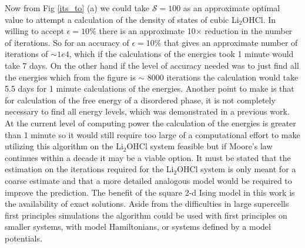 \documentclass[aps,prl,reprint,superscriptaddress,showkeys]{revtex4-1}
\begin{document}
 Now from Fig \ref{its_to} (a) we could take $\mathcal{S}=100$  as an approximate optimal value to attempt a calculation of the density of states of cubic Li$_2$OHCl. In willing to accept $\epsilon=10\%$ there is an approximate 10$\times$ reduction in the number of iterations. So for an accuracy of $\epsilon=10\%$ that gives an approximate number of iterations of $\sim 1e4$, which if the calculations of the energies took 1 minute would take  7 days. On the other hand if the level of accuracy needed was to just find all the energies which from the figure is $\sim$ 8000 iterations the calculation would take 5.5 days for 1 minute calculations of the energies. Another point to make is that for calculation of the free energy of a disordered phase, it is not completely necessary to find all energy levels, which was demonstrated in a previous work. At the current level of computing power the calculation of the energies is greater than 1 minute so it would still require too large of a computational effort to make utilizing this algorithm on the Li$_2$OHCl system feasible but if Moore's law continues within a decade it may be a viable option. It must be stated that the estimation on the iterations required for the Li$_2$OHCl system is only meant for a coarse estimate and that a more detailed analogous model would be required to improve the prediction. The benefit of the square 2-d Ising model in this work is the availability of exact solutions. Aside from the difficulties in large supercells first principles simulations the algorithm could be used with first principles on smaller systems, with model Hamiltonians, or systems defined by a model potentials.  
\end{document}
